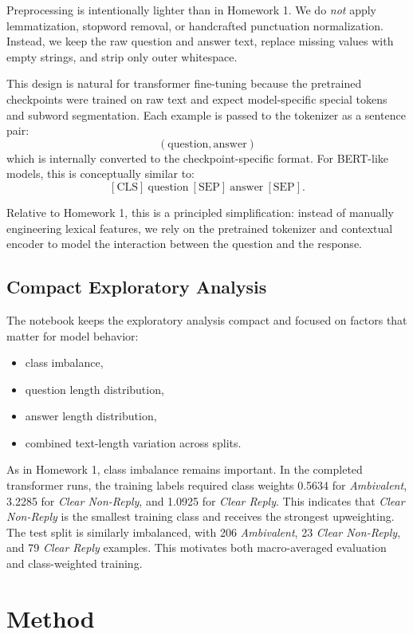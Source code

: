 Preprocessing is intentionally lighter than in Homework 1. We do \emph{not} apply lemmatization, stopword removal, or handcrafted punctuation normalization. Instead, we keep the raw question and answer text, replace missing values with empty strings, and strip only outer whitespace.

This design is natural for transformer fine-tuning because the pretrained checkpoints were trained on raw text and expect model-specific special tokens and subword segmentation. Each example is passed to the tokenizer as a sentence pair:
\[
(\text{question}, \text{answer})
\]
which is internally converted to the checkpoint-specific format. For BERT-like models, this is conceptually similar to:
\[
[\text{CLS}]~\text{question}~[\text{SEP}]~\text{answer}~[\text{SEP}].
\]

Relative to Homework 1, this is a principled simplification: instead of manually engineering lexical features, we rely on the pretrained tokenizer and contextual encoder to model the interaction between the question and the response.

\subsection{Compact Exploratory Analysis}

The notebook keeps the exploratory analysis compact and focused on factors that matter for model behavior:
\begin{itemize}
	\item class imbalance,
	\item question length distribution,
	\item answer length distribution,
	\item combined text-length variation across splits.
\end{itemize}

As in Homework 1, class imbalance remains important. In the completed transformer runs, the training labels required class weights 0.5634 for \emph{Ambivalent}, 3.2285 for \emph{Clear Non-Reply}, and 1.0925 for \emph{Clear Reply}. This indicates that \emph{Clear Non-Reply} is the smallest training class and receives the strongest upweighting. The test split is similarly imbalanced, with 206 \emph{Ambivalent}, 23 \emph{Clear Non-Reply}, and 79 \emph{Clear Reply} examples. This motivates both macro-averaged evaluation and class-weighted training.

\section{Method}

